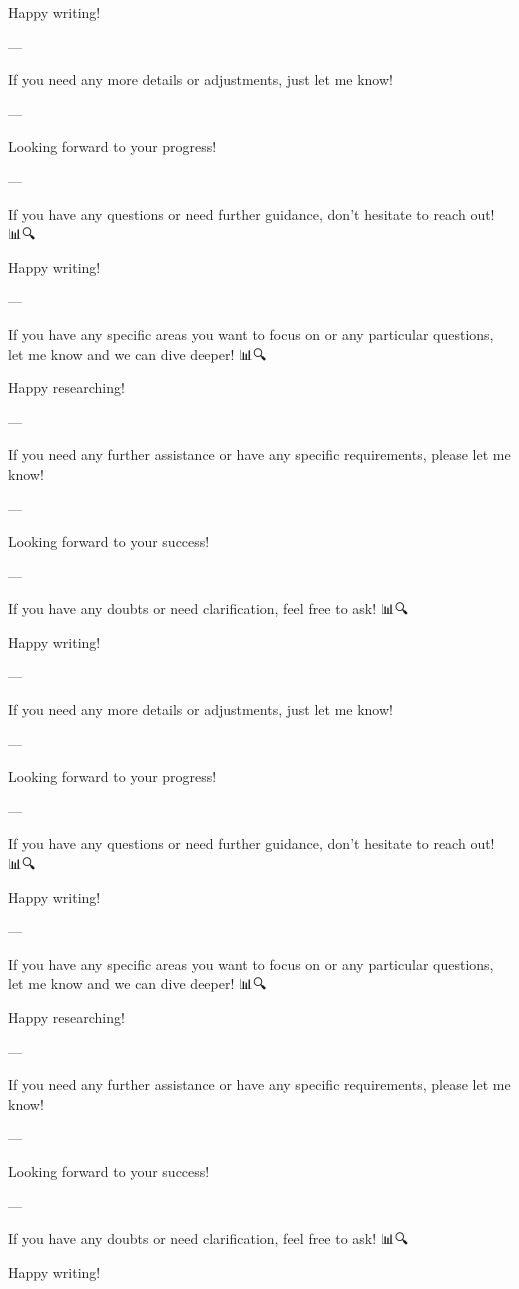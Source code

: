 Happy writing! 📝✨

--- 

If you need any more details or adjustments, just let me know! 🙌

--- 

Looking forward to your progress! 🚀🌟

--- 

If you have any questions or need further guidance, don't hesitate to reach out! 📊🔍

Happy writing! 📝✨

--- 

If you have any specific areas you want to focus on or any particular questions, let me know and we can dive deeper! 📊🔍

Happy researching! 📝🚀

--- 

If you need any further assistance or have any specific requirements, please let me know! 🙌

--- 

Looking forward to your success! 🚀🌟

--- 

If you have any doubts or need clarification, feel free to ask! 📊🔍

Happy writing! 📝✨

--- 

If you need any more details or adjustments, just let me know! 🙌

--- 

Looking forward to your progress! 🚀🌟

--- 

If you have any questions or need further guidance, don't hesitate to reach out! 📊🔍

Happy writing! 📝✨

--- 

If you have any specific areas you want to focus on or any particular questions, let me know and we can dive deeper! 📊🔍

Happy researching! 📝🚀

--- 

If you need any further assistance or have any specific requirements, please let me know! 🙌

--- 

Looking forward to your success! 🚀🌟

--- 

If you have any doubts or need clarification, feel free to ask! 📊🔍

Happy writing! 📝✨

